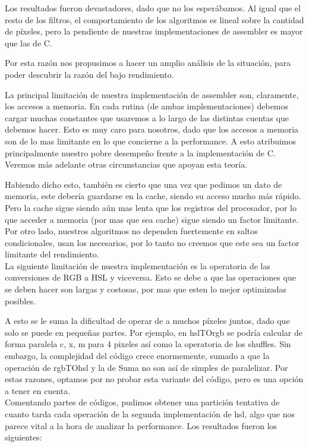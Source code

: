 Los resultados fueron devastadores, dado que no los esperábamos. Al igual que el resto de los filtros, el comportamiento de los algoritmos es lineal sobre la cantidad de píxeles, pero la pendiente de nuestras implementaciones de assembler es mayor que las de C.

Por esta razón nos propusimos a hacer un amplio análisis de la situación, para poder descubrir la razón del bajo rendimiento.

La principal limitación de nuestra implementación de assembler son, claramente, los accesos a memoria. En cada rutina (de ambas implementaciones) debemos cargar muchas constantes que usaremos a lo largo de las distintas cuentas que debemos hacer.
Esto es muy caro para nosotros, dado que los accesos a memoria son de lo mas limitante en lo que concierne a la performance. 
A esto atribuimos principalmente nuestro pobre desempeño frente a la implementación de C. Veremos más adelante otras circunstancias que apoyan esta teoría.

Habiendo dicho esto, también es cierto que una vez que pedimos un dato de memoria, este debería guardarse en la cache, siendo su acceso mucho más rápido. Pero la cache sigue siendo aún mas lenta que los registros del procesador, por lo que acceder a memoria (por mas que sea cache) sigue siendo un factor limitante.
\\

Por otro lado, nuestros algoritmos no dependen fuertemente en saltos condicionales, usan los necesarios, por lo tanto no creemos que este sea un factor limitante del rendimiento.
\\

La siguiente limitación de nuestra implementación es la operatoria de las conversiones de RGB a HSL y viceversa. Esto se debe a que las operaciones que se deben hacer son largas y costosas, por mas que esten lo mejor optimizadas posibles.

A esto se le suma la dificultad de operar de a muchos píxeles juntos, dado que solo se puede en pequeñas partes.
Por ejemplo, en hslTOrgb se podría calcular de forma paralela c, x, m para 4 pixeles así como la operatoria de los shuffles.
Sin embargo, la complejidad del código crece enormemente, sumado a que la operación de rgbTOhsl y la de Suma no son así de simples de paralelizar.
Por estas razones, optamos por no probar esta variante del código, pero es una opción a tener en cuenta.
\\

Comentando partes de códigos, pudimos obtener una partición tentativa de cuanto tarda cada operación de la segunda implementación de hsl, algo que nos parece vital a la hora de analizar la performance. Los resultados fueron los siguientes:


